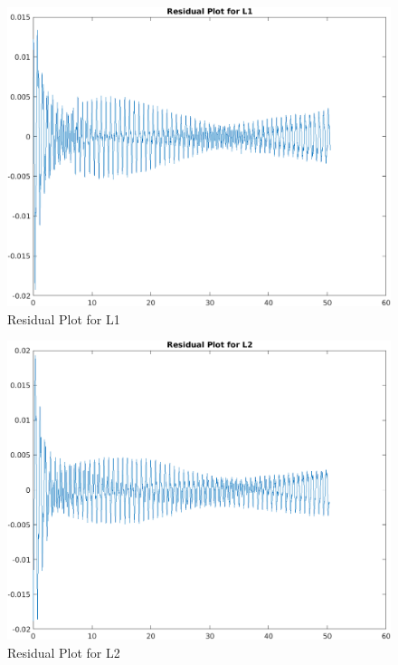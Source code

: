 \begin{figure}[h!]
    \centering
    \includegraphics[width=\textwidth]{figures/L1_R.png}
    \caption{Residual Plot for L1}
    \label{fig:yx}
\end{figure}
\newpage
\begin{figure}[h!]
    \centering
    \includegraphics[width=\textwidth]{figures/L2_R.png}
    \caption{Residual Plot for L2}
    \label{fig:yx}
\end{figure}
\newpage
